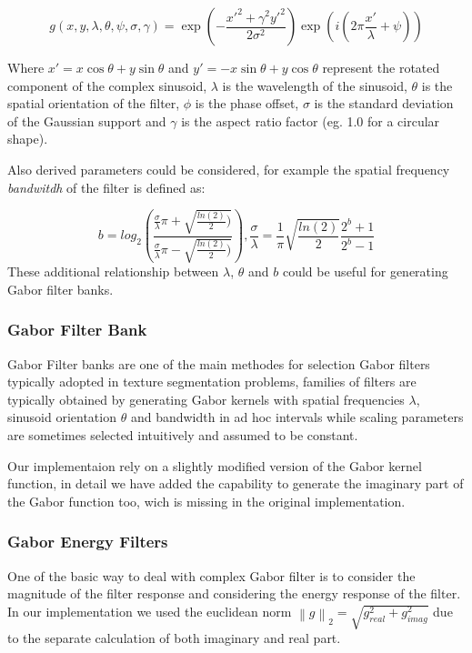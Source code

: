 \begin{equation}
g(x,y,\lambda,\theta,\psi,\sigma,\gamma) = \exp \left( - \frac{ x'^2 + \gamma^2 y'^2 }{ 2 \sigma^2} \right ) \exp \left( i \left( 2 \pi \frac{x'}{\lambda} + \psi \right ) \right )
\end{equation}

Where $x' = x \cos\theta + y \sin\theta$ and $y' = -x \sin\theta + y \cos\theta$ represent the rotated component of the complex sinusoid, $\lambda$ is the wavelength of the sinusoid, $\theta$ is the spatial orientation of the filter, $\phi$ is the phase offset, $\sigma$ is the standard deviation of the Gaussian support and $\gamma$ is the aspect ratio factor (eg. 1.0 for a circular shape).

Also derived parameters could be considered, for example the spatial frequency \emph{bandwitdh} of the filter is defined as:

\begin{equation}
b = log_2 \left ( \frac{ \frac{\sigma}{\lambda} \pi + \sqrt{ \frac{ln(2)}{2} )} }{  \frac{\sigma}{\lambda} \pi - \sqrt{ \frac{ln(2)}{2} )} } \right ),  \frac{\sigma}{\lambda} = \frac{1}{\pi} \sqrt{ \frac{ln(2)}{2} } \frac{2^b+1}{2^b-1} 
\end{equation}
These additional relationship between $\lambda$, $\theta$ and $b$ could be useful for generating Gabor filter banks\cite{gaborParams}. 

\subsubsection*{Gabor Filter Bank}
Gabor Filter banks are one of the main methodes for selection Gabor filters typically adopted in texture segmentation problems, families of filters are typically obtained by generating Gabor kernels with spatial frequencies $\lambda$, sinusoid orientation $\theta$ and bandwidth in ad hoc intervals while scaling parameters are sometimes selected intuitively and assumed to be constant. 

Our implementaion rely on a slightly modified version of the  Gabor kernel function, in detail we have added the capability to generate the imaginary part of the Gabor function too, wich is missing in the original implementation.

\subsubsection*{Gabor Energy Filters}
One of the basic way to deal with complex Gabor filter is to consider the magnitude of the filter response and considering the energy response of the filter. In our implementation we used the euclidean norm $ \left \| g \right \|_2 = \sqrt{ g_{real}^2 + g_{imag}^2 }$ due to the separate calculation of both imaginary and real part.

